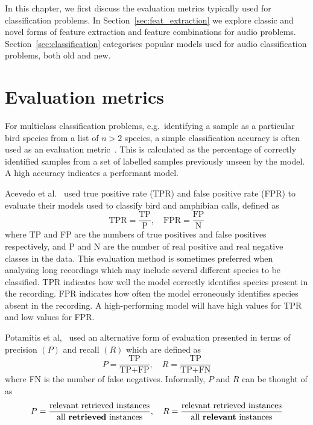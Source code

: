In this chapter, we first discuss the evaluation metrics typically used for
classification problems. In Section~\ref{sec:feat_extraction} we explore classic
and novel forms of feature extraction and feature combinations for audio
problems. Section~\ref{sec:classification} categorises popular models used for
audio classification problems, both old and new.

\section{Evaluation metrics}\label{sec:eval_metrics}

For multiclass classification problems, e.g.\ identifying a sample as a
particular bird species from a list of $n > 2$ species, a simple classification
accuracy is often used as an evaluation
metric~\cite{chakraborty2016bird,ramashini2022robust}. This is calculated as
the percentage of correctly identified samples from a set of labelled samples
previously unseen by the model. A high accuracy indicates a performant model.

Acevedo et al.~\cite{acevedo2009automated} used true positive rate (TPR) and false
positive rate (FPR) to evaluate their models used to classify bird and amphibian
calls, defined as
\begin{equation}
  \text{TPR} = \frac{\text{TP}}{\text{P}}, \hspace{1em}
  \text{FPR} = \frac{\text{FP}}{\text{N}}
\end{equation}
where TP and FP are the numbers of true positives and false positives
respectively, and P and N are the number of real positive and real negative
classes in the data. This evaluation method is sometimes preferred when
analysing long recordings which may include several different species to be
classified. TPR indicates how well the model correctly identifies
species present in the recording. FPR indicates how often the model erroneously
identifies species absent in the recording. A high-performing model will have
high values for TPR and low values for FPR\@.

Potamitis et al,~\cite{potamitis2014automatic} used an alternative form of
evaluation presented in terms of precision $(P)$ and recall $(R)$ which are
defined as
\begin{equation}
  P = \frac{\text{TP}}{\text{TP}+\text{FP}}, \hspace{1em}
  R = \frac{\text{TP}}{\text{TP}+\text{FN}}
\end{equation}
where FN is the number of false negatives. Informally, $P$ and $R$ can be
thought of as
\begin{equation}
  P = \frac{\text{relevant retrieved instances}}{\text{all \textbf{retrieved} instances}}, \hspace{1em}
  R = \frac{\text{relevant retrieved instances}}{\text{all \textbf{relevant} instances}}
\end{equation}


